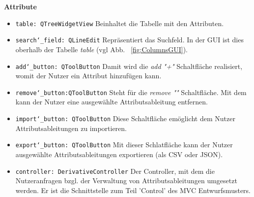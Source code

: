 \documentclass{article}
\begin{document}
\textbf{{Attribute}}
\begin{itemize}
\item \texttt{table: QTreeWidgetView} \newline Beinhaltet die Tabelle mit den Attributen.
\item \texttt{search\char`_field: QLineEdit} \newline Repräsentiert das Suchfeld. In der GUI ist dies oberhalb der Tabelle \textit{table} (vgl Abb. ~\ref{fig:ColumnsGUI}).
\item \texttt{add\char`_button: QToolButton} \newline Damit wird die \textit{add "+"} Schaltfläche realisiert, womit der Nutzer ein Attribut hinzufügen kann.
\item \texttt{remove\char`_button:QToolButton} \newline Steht für die \textit{remove "\textendash"} Schaltfläche. Mit dem kann der Nutzer eine ausgewählte Attributsableitung entfernen. 
\item \texttt{import\char`_button: QToolButton} \newline Diese Schaltfläche emöglicht dem Nutzer Attributsableitungen zu importieren.
\item \texttt{export\char`_button: QToolButton} \newline Mit dieser Schlatfläche kann der Nutzer ausgewählte Attributsableitungen exportieren (als CSV oder JSON).
\item \texttt{controller: DerivativeController} \newline Der Controller, mit dem die Nutzeranfragen bzgl. der Verwaltung von Attributsableitungen umgesetzt werden. Er ist die Schnittstelle zum Teil 'Control' des MVC Entwurfsmusters.
\end{itemize}
\end{document}
